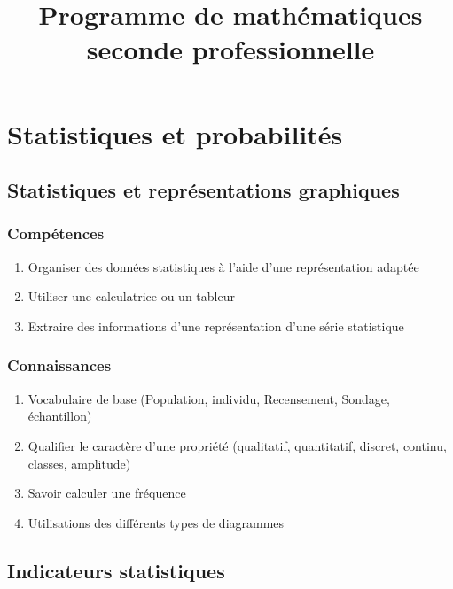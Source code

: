 \documentclass[12pt,a4paper]{article}
\author{}
\date{}
\title{Programme de mathématiques seconde professionnelle}
\begin{document}
\maketitle

\section{Statistiques et probabilités}

\subsection{Statistiques et représentations graphiques }\label{ch:2:stats_base}

\begin{multicols}{2}
	

\subsubsection*{Compétences}

\begin{enumerate}
	\item Organiser des données statistiques à l'aide d'une représentation adaptée
	\item Utiliser une calculatrice ou un tableur
	\item Extraire des informations d'une représentation d'une série statistique
\end{enumerate}

\subsubsection*{Connaissances}

\begin{enumerate}
	\item Vocabulaire de base (Population, individu, Recensement, Sondage, échantillon) 
	\item Qualifier le caractère d'une propriété (qualitatif, quantitatif, discret, continu, classes, amplitude)
	\item Savoir calculer une fréquence
	\item Utilisations des différents types de diagrammes	
\end{enumerate}

\end{multicols}
\subsection{Indicateurs statistiques}\label{ch:2:indicateurs}
\end{document}
